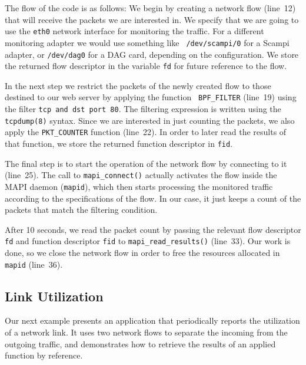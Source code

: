 \documentclass[a4paper, 11pt]{article}
\begin{document}
The flow of the code is as follows: We begin by creating a network flow
(line~12) that will receive the packets we are interested in.
We specify that we are going to use the {\tt eth0} network interface
for monitoring the traffic.
For a different monitoring adapter we would use something like {\tt
/dev/scampi/0} for a Scampi adapter, or {\tt /dev/dag0} for a DAG card,
depending on the configuration. We store the returned flow descriptor in the
variable {\tt fd} for future reference to the flow.

In the next step we restrict the packets of the newly created flow to
those destined to our web server by applying the function {\tt
BPF\_FILTER} (line~19) using the filter {\tt tcp and dst port 80}.
The filtering expression is written using the {\tt tcpdump(8)}
syntax. Since we are interested in just counting the packets, we also
apply the {\tt PKT\_COUNTER} function (line~22). 
In order to later read the results of that function,
we store the returned function descriptor in {\tt fid}.

The final step is to start the operation of the network flow by connecting
to it (line~25). The call to {\tt mapi\_connect()}
actually activates the flow inside the MAPI daemon ({\tt mapid}),
which then starts processing the monitored traffic according to
the specifications of the flow. In our case, it just keeps a count of the
packets that match the filtering condition.

After 10 seconds, we read the packet count by passing the relevant
flow descriptor {\tt fd} and function descriptor {\tt fid}
to {\tt mapi\_read\_results()} (line~33).
Our work is done, so we close the network flow in order to free the
resources allocated in {\tt mapid} (line~36).

\subsection{Link Utilization}

Our next example presents an application that periodically reports the
utilization of a network link. It uses two network flows to separate the
incoming from the outgoing traffic, and demonstrates how to retrieve the
results of an applied function by reference.
\end{document}
